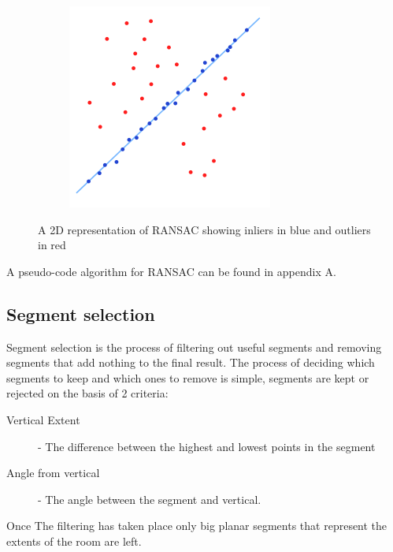 \begin{figure}[H]
\begin{subfigure}{.5\textwidth}
						\includegraphics[width=1\linewidth]{Includes/images/random_sample_example2}
						\label{fig:RANSAC2}
					\end{subfigure}
					\caption{A 2D representation of RANSAC showing inliers in blue and outliers in red}
				\end{figure} 
			 
				
				A pseudo-code algorithm for RANSAC can be found in appendix A.
		\subsection{Segment selection}
			Segment selection is the process of filtering out useful segments and removing segments that add nothing to the final result. The process of deciding which segments to keep and which ones to remove is simple, segments are kept or rejected on the basis of 2 criteria:
			
			\begin{description}
				\item[Vertical Extent] - The  difference between the highest and lowest points in the segment
				\item[Angle from vertical] - The angle between the segment and vertical.
			\end{description}
			
			Once The filtering has taken place only big planar segments that represent the extents of the room are left.
			
